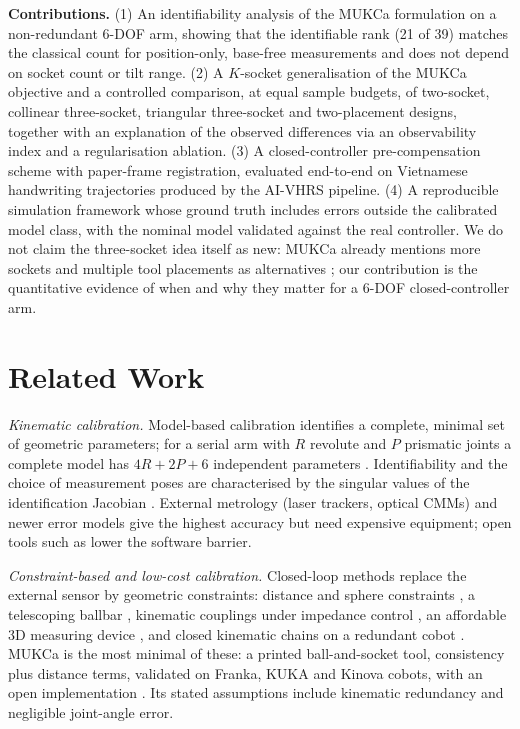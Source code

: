 \documentclass[conference]{IEEEtran}
\begin{document}
\textbf{Contributions.} (1) An identifiability analysis of the MUKCa formulation on a non-redundant 6-DOF arm, showing that
the identifiable rank (21 of 39) matches the classical count for position-only, base-free measurements and does not depend on
socket count or tilt range. (2) A $K$-socket generalisation of the MUKCa objective and a controlled comparison, at equal
sample budgets, of two-socket, collinear three-socket, triangular three-socket and two-placement designs, together with an
explanation of the observed differences via an observability index and a regularisation ablation. (3) A closed-controller
pre-compensation scheme with paper-frame registration, evaluated end-to-end on Vietnamese handwriting trajectories produced
by the AI-VHRS pipeline. (4) A reproducible simulation framework whose ground truth includes errors outside the calibrated
model class, with the nominal model validated against the real controller. We do not claim the three-socket idea itself as
new: MUKCa already mentions more sockets and multiple tool placements as alternatives \cite{franzese2026mukca}; our
contribution is the quantitative evidence of when and why they matter for a 6-DOF closed-controller arm.

\section{Related Work}
\textit{Kinematic calibration.} Model-based calibration identifies a complete, minimal set of geometric parameters; for a
serial arm with $R$ revolute and $P$ prismatic joints a complete model has $4R+2P+6$ independent parameters
\cite{everett1987,zhuang1992}. Identifiability and the choice of measurement poses are characterised by the singular values
of the identification Jacobian \cite{borm1991,hollerbach1996}. External metrology (laser trackers, optical CMMs)
\cite{nubiola2013} and newer error models \cite{kim2024,alam2022} give the highest accuracy but need expensive equipment;
open tools such as \cite{pascal2023} lower the software barrier.

\textit{Constraint-based and low-cost calibration.} Closed-loop methods replace the external sensor by geometric
constraints: distance and sphere constraints \cite{joubair2015}, a telescoping ballbar \cite{nubiola2014ballbar}, kinematic
couplings under impedance control \cite{nadeau2019}, an affordable 3D measuring device \cite{gaudreault2018}, and closed
kinematic chains on a redundant cobot \cite{petric2023}. MUKCa \cite{franzese2026mukca} is the most minimal of these: a
printed ball-and-socket tool, consistency plus distance terms, validated on Franka, KUKA and Kinova cobots, with an open
implementation \cite{mukcacode}. Its stated assumptions include kinematic redundancy and negligible joint-angle error.
\end{document}
